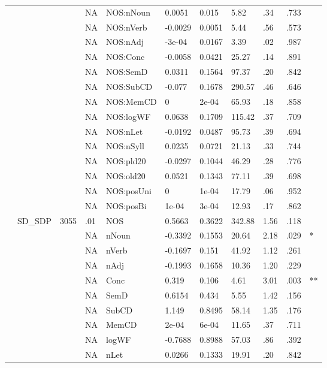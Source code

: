 \begin{table}[ht]
\begin{tabular}{lllllllllll}
   &  &  & NA & NOS:nNoun & 0.0051 & 0.015 & 5.82 & .34 & .733 &   \\ 
   &  &  & NA & NOS:nVerb & -0.0029 & 0.0051 & 5.44 & .56 & .573 &   \\ 
   &  &  & NA & NOS:nAdj & -3e-04 & 0.0167 & 3.39 & .02 & .987 &   \\ 
   &  &  & NA & NOS:Conc & -0.0058 & 0.0421 & 25.27 & .14 & .891 &   \\ 
   &  &  & NA & NOS:SemD & 0.0311 & 0.1564 & 97.37 & .20 & .842 &   \\ 
   &  &  & NA & NOS:SubCD & -0.077 & 0.1678 & 290.57 & .46 & .646 &   \\ 
   &  &  & NA & NOS:MemCD & 0 & 2e-04 & 65.93 & .18 & .858 &   \\ 
   &  &  & NA & NOS:logWF & 0.0638 & 0.1709 & 115.42 & .37 & .709 &   \\ 
   &  &  & NA & NOS:nLet & -0.0192 & 0.0487 & 95.73 & .39 & .694 &   \\ 
   &  &  & NA & NOS:nSyll & 0.0235 & 0.0721 & 21.13 & .33 & .744 &   \\ 
   &  &  & NA & NOS:pld20 & -0.0297 & 0.1044 & 46.29 & .28 & .776 &   \\ 
   &  &  & NA & NOS:old20 & 0.0521 & 0.1343 & 77.11 & .39 & .698 &   \\ 
   &  &  & NA & NOS:posUni & 0 & 1e-04 & 17.79 & .06 & .952 &   \\ 
   &  &  & NA & NOS:posBi & 1e-04 & 3e-04 & 12.93 & .17 & .862 &   \\ 
   & SD\_SDP & 3055 & .01 & NOS & 0.5663 & 0.3622 & 342.88 & 1.56 & .118 &   \\ 
   &  &  & NA & nNoun & -0.3392 & 0.1553 & 20.64 & 2.18 & .029 & * \\ 
   &  &  & NA & nVerb & -0.1697 & 0.151 & 41.92 & 1.12 & .261 &   \\ 
   &  &  & NA & nAdj & -0.1993 & 0.1658 & 10.36 & 1.20 & .229 &   \\ 
   &  &  & NA & Conc & 0.319 & 0.106 & 4.61 & 3.01 & .003 & ** \\ 
   &  &  & NA & SemD & 0.6154 & 0.434 & 5.55 & 1.42 & .156 &   \\ 
   &  &  & NA & SubCD & 1.149 & 0.8495 & 58.14 & 1.35 & .176 &   \\ 
   &  &  & NA & MemCD & 2e-04 & 6e-04 & 11.65 & .37 & .711 &   \\ 
   &  &  & NA & logWF & -0.7688 & 0.8988 & 57.03 & .86 & .392 &   \\ 
   &  &  & NA & nLet & 0.0266 & 0.1333 & 19.91 & .20 & .842 &   \\ 

\end{tabular}
\end{table}
